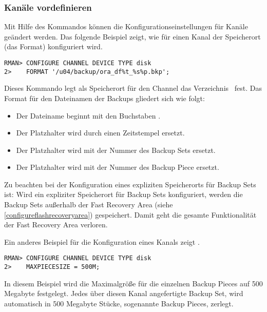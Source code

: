         \subsubsection{Kanäle vordefinieren}
          Mit Hilfe des Kommandos  können die Konfigurationseinstellungen für Kanäle geändert werden. Das folgende Beispiel zeigt, wie für einen Kanal der Speicherort (das Format) konfiguriert wird.
          \begin{lstlisting}[caption={Vordefinieren eines Channels mit Speicherort},label=admin1015,language=rman]
RMAN> CONFIGURE CHANNEL DEVICE TYPE disk
2>    FORMAT '/u04/backup/ora_df%t_%s%p.bkp';
          \end{lstlisting}
          Dieses Kommando legt als Speicherort für den Channel das Verzeichnis\  fest. Das Format für den Dateinamen der Backups gliedert sich wie folgt:
          \begin{itemize}
            \item Der Dateiname beginnt mit den Buchstaben .
            \item Der Platzhalter  wird durch einen Zeitstempel ersetzt.
            \item Der Platzhalter  wird mit der Nummer des Backup Sets ersetzt.
            \item Der Platzhalter  wird mit der Nummer des Backup Piece ersetzt.
          \end{itemize}

          \begin{merke}
            Zu beachten bei der Konfiguration eines expliziten Speicherorts für Backup Sets ist: Wird ein expliziter Speicherort für Backup Sets konfiguriert, werden die Backup Sets außerhalb der Fast Recovery Area (siehe \ref{configureflashrecoveryarea}) gespeichert. Damit geht die gesamte Funktionalität der Fast Recovery Area verloren.
          \end{merke}
          Ein anderes Beispiel für die Konfiguration eines Kanals zeigt .
          \begin{lstlisting}[caption={Ein vordefinierter Channel mit Backup Piece Size},label=admin1016,language=rman]
RMAN> CONFIGURE CHANNEL DEVICE TYPE disk
2>    MAXPIECESIZE = 500M;
          \end{lstlisting}
          In diesem Beispiel wird die Maximalgröße für die einzelnen Backup Pieces auf 500 Megabyte festgelegt.  Jedes über diesen Kanal angefertigte Backup Set, wird automatisch in 500 Megabyte Stücke, sogenannte Backup Pieces, zerlegt.

